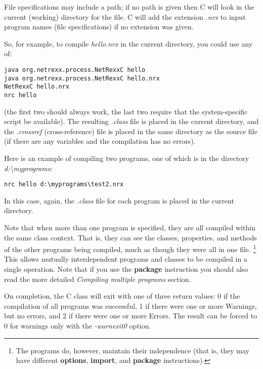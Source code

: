 File specifications may include a path; if no path is given then
\nr{}C will look in the current (working) directory for the file.
\nr{}C will add the extension \emph{.nrx} to input program names (file
specifications) if no extension was given.

So, for example, to compile \emph{hello.nrx} in the current directory,
you could use any of:
\begin{verbatim}
java org.netrexx.process.NetRexxC hello
java org.netrexx.process.NetRexxC hello.nrx
NetRexxC hello.nrx
nrc hello
\end{verbatim}
(the first two should always work, the last two require that the
system-specific script be available).  The resulting \emph{.class} file
is placed in the current directory, and the \emph{.crossref}
(cross-reference) file is placed in the same directory as the source
file (if there are any variables and the compilation has no errors).

Here is an example of compiling two programs, one of which is in the
directory \emph{d:\textbackslash myprograms}:
\begin{verbatim}
nrc hello d:\myprograms\test2.nrx
\end{verbatim}

In this case, again, the \emph{.class} file for each program is placed
in the current directory.

Note that when more than one program is specified, they are all compiled
within the same class context.  That is, they can see the
classes, properties, and methods of the other programs being compiled,
much as though they were all in one file.
\footnote{The programs do, however, maintain their independence (that is, they may
have different \textbf{options}, \textbf{import}, and \textbf{package}
instructions).}
This allows mutually interdependent programs and classes to be compiled
in a single operation.
Note that if you use the \textbf{package} instruction you should also
read the more detailed \emph{Compiling multiple
programs} section.%

On completion, the \nr{}C class will exit with one of three return
values: 0 if the compilation of all programs was successful, 1 if there
were one or more Warnings, but no errors, and 2 if there were one or
more Errors. The result can be forced to 0 for warnings only with the
\emph{-warnexit0} option.

